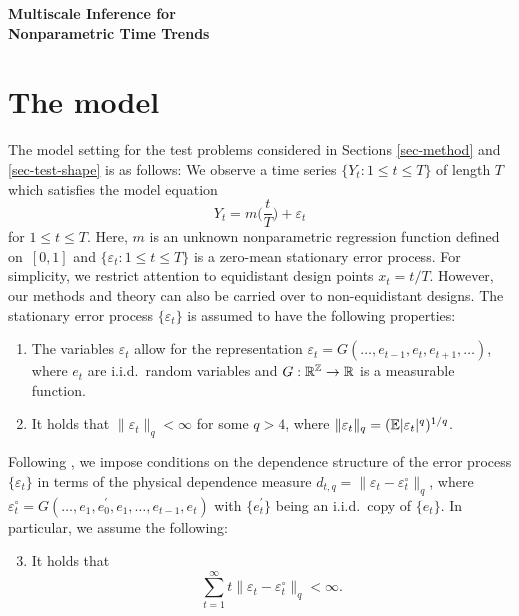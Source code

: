 \documentclass[a4paper,12pt]{article}
\numberwithin{equation}{section}
\begin{document}
\begin{center}
{\LARGE \textbf{Multiscale Inference for}} \\[0.35cm]
{\LARGE \textbf{Nonparametric Time Trends}}
\end{center}



\section{The model}


The model setting for the test problems considered in Sections \ref{sec-method} and \ref{sec-test-shape} is as follows: We observe a time series $\{Y_t: 1 \le t \le T \}$ of length $T$ which satisfies the model equation 
\begin{equation}\label{model1}
Y_t = m \Big( \frac{t}{T} \Big) + \varepsilon_t 
\end{equation}
for $1 \le t \le T$. Here, $m$ is an unknown nonparametric regression function defined on~$[0,1]$ and $\{ \varepsilon_t: 1 \le t \le T \}$ is a zero-mean stationary error process. For simplicity, we restrict attention to equidistant design points $x_t = t/T$. However, our methods and theory can also be carried over to non-equidistant designs. The stationary error process $\{\varepsilon_t\}$ is assumed to have the following properties: 
\begin{enumerate}[label=(C\arabic*),leftmargin=1.05cm]

\item \label{C-err1} The variables $\varepsilon_t$ allow for the representation $\varepsilon_t = G(\ldots,e_{t-1},e_t,e_{t+1},\ldots)$, where $e_t$ are i.i.d.\ random variables and $G: \mathbb{R}^{\mathbb{Z}} \rightarrow \mathbb{R}$ is a measurable function. 

\item \label{C-err2} It holds that $\| \varepsilon_t \|_q < \infty$ for some $q > 4$, where $\| \varepsilon_t \|_q = (\mathbb{E}|\varepsilon_t|^q)^{1/q}$. 

\end{enumerate}
Following \cite{Wu2005}, we impose conditions on the dependence structure of the error process $\{\varepsilon_t\}$ in terms of the physical dependence measure $d_{t,q} = \| \varepsilon_t - \varepsilon_t^\circ \|_q$, where $\varepsilon_t^\circ = G(\ldots,e_1,e_0^\prime,e_1,\ldots,e_{t-1},e_t)$ with $\{e_t^\prime\}$ being an i.i.d.\ copy of $\{e_t\}$. In particular, we assume the following: 
\begin{enumerate}[label=(C\arabic*),leftmargin=1.05cm]
\setcounter{enumi}{2}

\item \label{C-err3} It holds that 
\[ \sum_{t=1}^\infty t \| \varepsilon_t - \varepsilon_t^\circ \|_q < \infty. \]

\end{enumerate}
\end{document}

